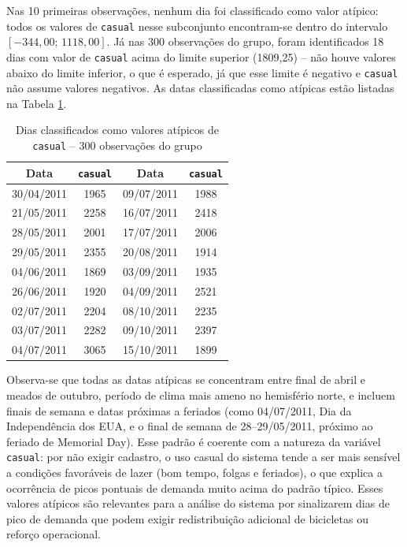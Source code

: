 \documentclass[10pt, a4paper]{article}
\begin{document}
Nas 10 primeiras observações, nenhum dia foi classificado como valor atípico: todos os valores de \texttt{casual} nesse subconjunto encontram-se dentro do intervalo $[-344{,}00;\,1118{,}00]$. Já nas 300 observações do grupo, foram identificados 18 dias com valor de \texttt{casual} acima do limite superior (1809,25) -- não houve valores abaixo do limite inferior, o que é esperado, já que esse limite é negativo e \texttt{casual} não assume valores negativos. As datas classificadas como atípicas estão listadas na Tabela \ref{tab:outliers-300}.

\begin{table}[h]
\centering
\caption{Dias classificados como valores atípicos de \texttt{casual} -- 300 observações do grupo}
\label{tab:outliers-300}
\begin{tabular}{cc|cc}
\hline
\textbf{Data} & \textbf{\texttt{casual}} & \textbf{Data} & \textbf{\texttt{casual}} \\
\hline
30/04/2011 & 1965 & 09/07/2011 & 1988 \\
21/05/2011 & 2258 & 16/07/2011 & 2418 \\
28/05/2011 & 2001 & 17/07/2011 & 2006 \\
29/05/2011 & 2355 & 20/08/2011 & 1914 \\
04/06/2011 & 1869 & 03/09/2011 & 1935 \\
26/06/2011 & 1920 & 04/09/2011 & 2521 \\
02/07/2011 & 2204 & 08/10/2011 & 2235 \\
03/07/2011 & 2282 & 09/10/2011 & 2397 \\
04/07/2011 & 3065 & 15/10/2011 & 1899 \\
\hline
\end{tabular}
\end{table}

Observa-se que todas as datas atípicas se concentram entre final de abril e meados de outubro, período de clima mais ameno no hemisfério norte, e incluem finais de semana e datas próximas a feriados (como 04/07/2011, Dia da Independência dos EUA, e o final de semana de 28--29/05/2011, próximo ao feriado de Memorial Day). Esse padrão é coerente com a natureza da variável \texttt{casual}: por não exigir cadastro, o uso casual do sistema tende a ser mais sensível a condições favoráveis de lazer (bom tempo, folgas e feriados), o que explica a ocorrência de picos pontuais de demanda muito acima do padrão típico. Esses valores atípicos são relevantes para a análise do sistema por sinalizarem dias de pico de demanda que podem exigir redistribuição adicional de bicicletas ou reforço operacional.
\end{document}

